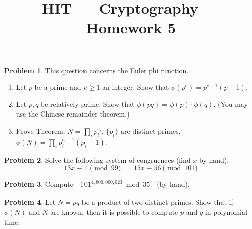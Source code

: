 \documentclass[11pt]{article}
\title{HIT --- Cryptography --- Homework 5}
\theoremstyle{definition}
\newtheorem{problem}{Problem}
\begin{document}
\maketitle

\begin{problem}
This question concerns the Euler phi function.
\begin{enumerate}
\item Let  $p$ be a prime and $e \ge 1$ an integer. Show that $\phi(p^e) = p^{e-1}(p-1)$.
\item Let $p,q$ be relatively prime. Show that $\phi(pq) = \phi(p)\cdot \phi(q)$. (You may use the Chinese remainder theorem.)
\item Prove Theorem: $N = \prod_ip_i^{e_i}$, $\{p_i\}$ are distinct primes, $\phi(N) = \prod_ip_i^{e_i-1}(p_i-1)$.
\end{enumerate}
\end{problem}

\begin{problem}
Solve the following system of congruences (find $x$ by hand):
\[ 13x \equiv 4 \pmod{99},\;\;\;\;\; 15x \equiv 56 \pmod{101}\]
\end{problem}

\begin{problem}
Compute $[101^{4,800,000,023} \bmod 35]$ (by hand).
\end{problem}

\begin{problem}
Let $N=pq$ be a product of two distinct primes. Show that if $\phi(N)$ and $N$ are known, then it is possible to compute $p$ and $q$ in polynomial time.
\end{problem}
\end{document}
